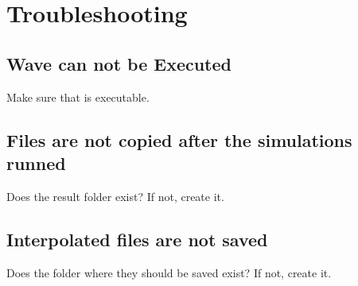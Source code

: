 \documentclass[letterpaper,10pt,english]{sphinxmanual}
\begin{document}
\section{Troubleshooting}
\label{\detokenize{installation:troubleshooting}}

\subsection{Wave can not be Executed}
\label{\detokenize{installation:wave-can-not-be-executed}}
\sphinxAtStartPar
Make sure that  is executable.


\subsection{Files are not copied after the simulations runned}
\label{\detokenize{installation:files-are-not-copied-after-the-simulations-runned}}
\sphinxAtStartPar
Does the result folder exist? If not, create it.


\subsection{Interpolated files are not saved}
\label{\detokenize{installation:interpolated-files-are-not-saved}}
\sphinxAtStartPar
Does the folder where they should be saved exist? If not, create it.
\end{document}
